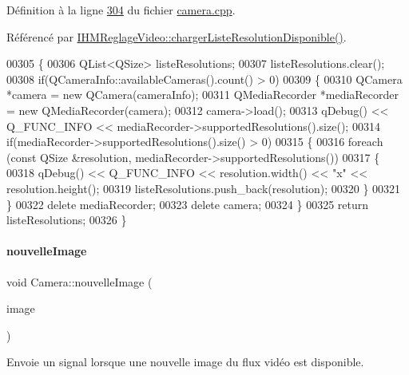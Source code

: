 Définition à la ligne \hyperlink{camera_8cpp_source_l00304}{304} du fichier \hyperlink{camera_8cpp_source}{camera.\+cpp}.



Référencé par \hyperlink{ihmreglagevideo_8cpp_source_l00179}{I\+H\+M\+Reglage\+Video\+::charger\+Liste\+Resolution\+Disponible()}.


\begin{DoxyCode}
00305 \{
00306     QList<QSize> listeResolutions;
00307     listeResolutions.clear();
00308     \textcolor{keywordflow}{if}(QCameraInfo::availableCameras().count() > 0)
00309     \{
00310         QCamera *camera = \textcolor{keyword}{new} QCamera(cameraInfo);
00311         QMediaRecorder *mediaRecorder = \textcolor{keyword}{new} QMediaRecorder(camera);
00312         camera->load();
00313         qDebug() << Q\_FUNC\_INFO << mediaRecorder->supportedResolutions().size();
00314         \textcolor{keywordflow}{if}(mediaRecorder->supportedResolutions().size() > 0)
00315         \{
00316             \textcolor{keywordflow}{foreach} (\textcolor{keyword}{const} QSize &resolution, mediaRecorder->supportedResolutions())
00317             \{
00318                 qDebug() << Q\_FUNC\_INFO << resolution.width() << \textcolor{stringliteral}{"x"} << resolution.height();
00319                 listeResolutions.push\_back(resolution);
00320             \}
00321         \}
00322         \textcolor{keyword}{delete} mediaRecorder;
00323         \textcolor{keyword}{delete} camera;
00324     \}
00325     \textcolor{keywordflow}{return} listeResolutions;
00326 \}
\end{DoxyCode}
\mbox{\label{class_camera_a38c810d466375e950401e483f885c52f}} 
\paragraph{\texorpdfstring{nouvelle\+Image}{nouvelleImage}}
{\footnotesize\ttfamily void Camera\+::nouvelle\+Image (\begin{DoxyParamCaption}\item[{Q\+Pixmap}]{image }\end{DoxyParamCaption})\hspace{0.3cm}{\ttfamily [signal]}}



Envoie un signal lorsque une nouvelle image du flux vidéo est disponible. 


